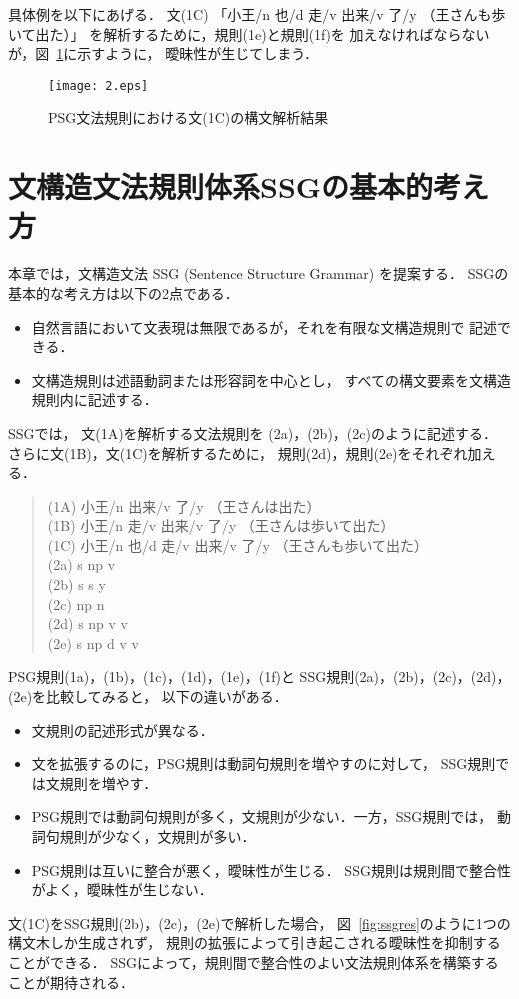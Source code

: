 \documentclass[japanese]{jnlp_1.3a}
\begin{document}
具体例を以下にあげる．
文(1C) 「小王/n 也/d 走/v 出来/v 了/y （王さんも歩いて出た）」
を解析するために，規則(1e)と規則(1f)を
加えなければならないが，図~\ref{fig:amb}に示すように，
曖昧性が生じてしまう．

\begin{figure}[t]
  \begin{center}
       \texttt{[image: 2.eps]}
   \caption{PSG文法規則における文(1C)の構文解析結果}
   \label{fig:amb}
  \end{center}
\end{figure}



\section{文構造文法規則体系SSGの基本的考え方}
本章では，文構造文法
SSG (Sentence Structure Grammar)
を提案する．
SSGの基本的な考え方は以下の2点である．
\begin{itemize}
  \item 自然言語において文表現は無限であるが，それを有限な文構造規則で
    記述できる．
  \item 文構造規則は述語動詞または形容詞を中心とし，
    すべての構文要素を文構造規則内に記述する．
\end{itemize}
SSGでは，
文(1A)を解析する文法規則を
(2a)，(2b)，(2c)のように記述する．
さらに文(1B)，文(1C)を解析するために，
規則(2d)，規則(2e)をそれぞれ加える．
\begin{quotation}\noindent
\文(1A) 小王/n 出来/v 了/y （王さんは出た）\\
\文(1B) 小王/n 走/v 出来/v 了/y （王さんは歩いて出た）\\
\文(1C) 小王/n 也/d 走/v 出来/v 了/y （王さんも歩いて出た）\\
(2a) s \ya np v\\
(2b) s \ya s y\\
(2c) np \ya n\\
(2d) s \ya np v v\\
(2e) s \ya np d v v\\
\end{quotation}

PSG規則(1a)，(1b)，(1c)，(1d)，(1e)，(1f)と
SSG規則(2a)，(2b)，(2c)，(2d)，(2e)を比較してみると，
以下の違いがある．

\begin{itemize}
  \item 文規則の記述形式が異なる．
  \item 文を拡張するのに，PSG規則は動詞句規則を増やすのに対して，
    SSG規則では文規則を増やす．
  \item PSG規則では動詞句規則が多く，文規則が少ない．一方，SSG規則では，
    動詞句規則が少なく，文規則が多い．
  \item PSG規則は互いに整合が悪く，曖昧性が生じる．
    SSG規則は規則間で整合性がよく，曖昧性が生じない．
\end{itemize}
文(1C)をSSG規則(2b)，(2c)，(2e)で解析した場合，
図~\ref{fig:ssgres}のように1つの構文木しか生成されず，
規則の拡張によって引き起こされる曖昧性を抑制することができる．
SSGによって，規則間で整合性のよい文法規則体系を構築することが期待される．
\end{document}
